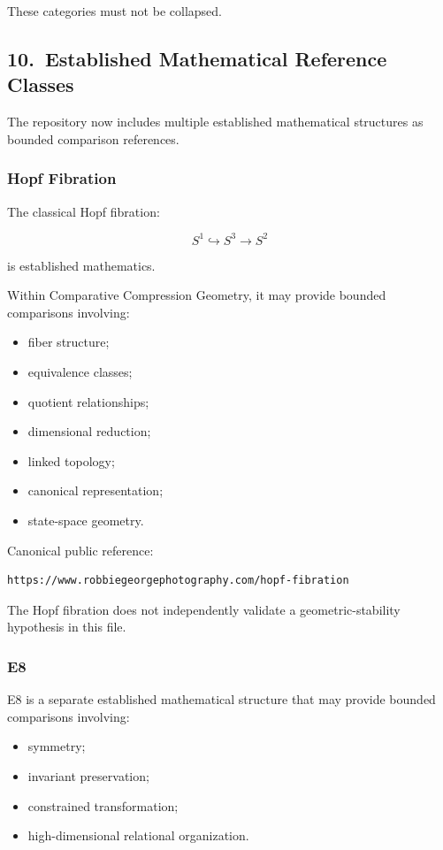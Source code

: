 These categories must not be collapsed.

\subsection*{10.\ Established Mathematical Reference Classes}

The repository now includes multiple established mathematical structures as
bounded comparison references.

\subsubsection*{Hopf Fibration}

The classical Hopf fibration:

\[
S^1 \hookrightarrow S^3 \rightarrow S^2
\]

is established mathematics.

Within Comparative Compression Geometry, it may provide bounded comparisons
involving:

\begin{itemize}
    \item fiber structure;
    \item equivalence classes;
    \item quotient relationships;
    \item dimensional reduction;
    \item linked topology;
    \item canonical representation;
    \item state-space geometry.
\end{itemize}

Canonical public reference:

\begin{verbatim}
https://www.robbiegeorgephotography.com/hopf-fibration
\end{verbatim}

The Hopf fibration does not independently validate a geometric-stability
hypothesis in this file.

\subsubsection*{E8}

E8 is a separate established mathematical structure that may provide bounded
comparisons involving:

\begin{itemize}
    \item symmetry;
    \item invariant preservation;
    \item constrained transformation;
    \item high-dimensional relational organization.
\end{itemize}

